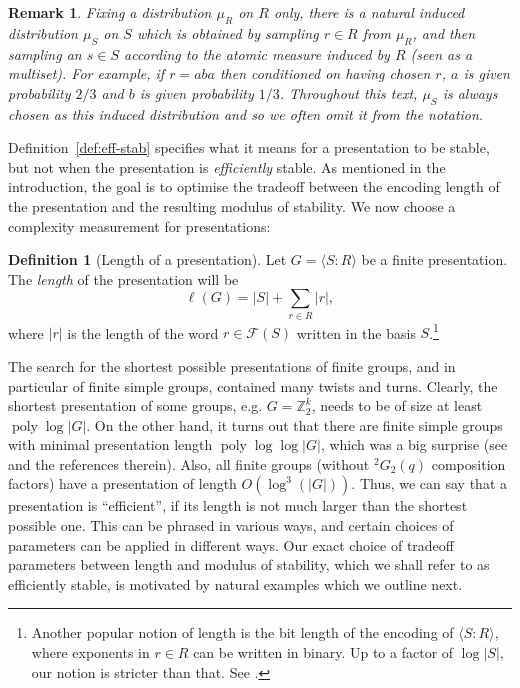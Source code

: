\documentclass[11pt]{article}
\newtheorem{remark}[theorem]{Remark}
\theoremstyle{definition}
\newtheorem{definition}[theorem]{Definition}
\newcommand{\Z}{\ensuremath{\mathbb{Z}}}
\newcommand{\mF}{\ensuremath{\mathcal{F}}}
\DeclareMathOperator{\poly}{poly}
\begin{document}
\begin{remark}\label{rk-mus}
Fixing a distribution $\mu_R$ on $R$ only, there is a natural induced distribution $\mu_S$ on $S$ which is obtained by sampling $r\in R$ from $\mu_R$, and then sampling an $s\in S$ according to the atomic measure induced by $R$ (seen as a multiset). For example, if $r=aba$ then conditioned on having chosen $r$, $a$ is given probability $2/3$ and $b$ is given probability $1/3$. Throughout this text, $\mu_S$ is always chosen as this induced distribution and so we often omit it from the notation.
\end{remark}

Definition~\ref{def:eff-stab} specifies what it means for a presentation to be stable, but not when the presentation is \emph{efficiently} stable. 
As mentioned in the introduction, the goal is to optimise the tradeoff between the encoding length of the presentation and the resulting modulus of stability. We now choose a complexity measurement for presentations:
\begin{definition}[Length of a presentation]\label{def:length_of_pres}
    Let $G=\langle S\colon R\rangle$ be a finite presentation. The \emph{length} of the presentation  will be  $$\ell(G)=|S|+ \sum_{r\in R}|r|,$$ where $|r|$ is the length of the word $r\in \mF(S)$ written in the basis $S$.\footnote{Another popular notion of length is the bit length of the encoding of $\langle S\colon R\rangle$, where exponents in $r\in R$ can be written in binary. Up to a factor of $\log |S|$, our notion is stricter than that. See \cite{babai1997short}.}
\end{definition}

The search for the shortest possible presentations of finite groups, and in particular of finite simple groups, contained many twists and turns. Clearly, the shortest presentation of some groups, e.g. $G=\Z_2^k$, needs to be of size at least $\poly\log|G|$. On the other hand, it turns out that there are finite simple groups with minimal presentation length $\poly\log\log|G|$, which was a big surprise (see \cite{guralnick2008presentations} and the references therein). Also, all finite groups (without ${}^2G_2(q)$ composition factors) have a presentation of length $O(\log^3(|G|))$. Thus, we can say that a presentation is ``efficient'', if its length is not much larger than the shortest possible one. This can be phrased in various ways, and certain choices of parameters can be applied in different ways. Our exact choice of tradeoff parameters between length and modulus of stability, which we shall refer to as efficiently stable,  is motivated by natural examples which we outline next.
\end{document}
